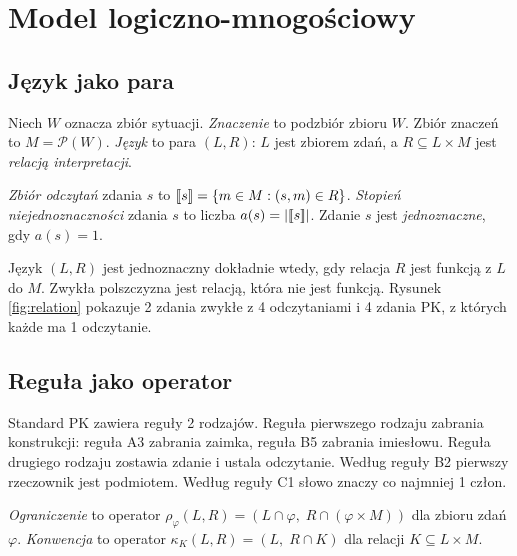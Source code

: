 \section{Model logiczno-mnogościowy}
\label{sec:model}

\subsection{Język jako para}

\begin{definition}
Niech $W$ oznacza zbiór sytuacji. \emph{Znaczenie} to podzbiór zbioru $W$. Zbiór znaczeń to
$M=\mathcal{P}(W)$. \emph{Język} to para $(L,R)$: $L$ jest zbiorem zdań, a
$R\subseteq L\times M$ jest \emph{relacją interpretacji}.
\end{definition}

\begin{definition}
\emph{Zbiór odczytań} zdania $s$ to $[\![s]\!]=\{m\in M:(s,m)\in R\}$. \emph{Stopień
niejednoznaczności} zdania $s$ to liczba $a(s)=|[\![s]\!]|$. Zdanie $s$ jest
\emph{jednoznaczne}, gdy $a(s)=1$.
\end{definition}

Język $(L,R)$ jest jednoznaczny dokładnie wtedy, gdy relacja $R$ jest funkcją z $L$ do $M$.
Zwykła polszczyzna jest relacją, która nie jest funkcją. Rysunek \ref{fig:relation}
pokazuje 2 zdania zwykłe z 4 odczytaniami i 4 zdania PK, z których każde ma 1 odczytanie.


\subsection{Reguła jako operator}

Standard PK zawiera reguły 2 rodzajów. Reguła pierwszego rodzaju zabrania konstrukcji:
reguła A3 zabrania zaimka, reguła B5 zabrania imiesłowu. Reguła drugiego rodzaju zostawia
zdanie i ustala odczytanie. Według reguły B2 pierwszy rzeczownik jest podmiotem. Według
reguły C1 słowo  znaczy co najmniej 1 człon.

\begin{definition}
\emph{Ograniczenie} to operator $\rho_\varphi(L,R)=(L\cap\varphi,\;R\cap(\varphi\times M))$
dla zbioru zdań $\varphi$. \emph{Konwencja} to operator $\kappa_K(L,R)=(L,\;R\cap K)$ dla
relacji $K\subseteq L\times M$.
\end{definition}

